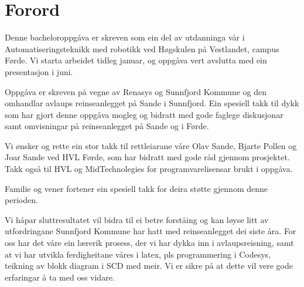 \chapter{Forord}
\thispagestyle{romanpages}

Denne bacheloroppgåva er skreven som ein del av utdanninga vår i Automatiseringsteknikk med robotikk ved Høgskulen på Vestlandet, campus Førde.
Vi starta arbeidet tidleg januar, og oppgåva vert avslutta med ein presentasjon i juni.

Oppgåva er skreven på vegne av \gls{Renasys}\citep{Renasys} og \gls{Sunnfjord Kommune}\citep{SunnfjordKommune} og den omhandlar 
avlaups reinseanlegget på Sande i Sunnfjord. 
Ein spesiell takk til dykk som har gjort denne oppgåva mogleg og
bidratt med gode faglege diskusjonar samt omvisningar på reinseanlegget på Sande og i Førde.

Vi ønsker og rette ein stor takk til rettleiarane våre Olav Sande, Bjarte Pollen og Joar Sande ved HVL Førde, som har bidratt med gode råd gjennom prosjektet.
Takk også til HVL og MidTechnolegies for programvarelisensar brukt i oppgåva.

Familie og vener fortener ein spesiell takk for deira støtte gjennom denne perioden.

Vi håpar sluttresultatet vil bidra til ei betre forståing og kan løyse litt av utfordringane Sunnfjord Kommune har hatt med reinseanlegget dei siste åra.
For oss har det våre ein lærerik prosess, der vi har dykka inn i avlaupsreisning, samt at vi har utvikla ferdigheitane våres i \gls{latex}, 
pls programmering i \gls{Codesys}, teikning av blokk diagram i SCD med meir. Vi er sikre på at dette vil vere gode erfaringar å ta med oss vidare.
